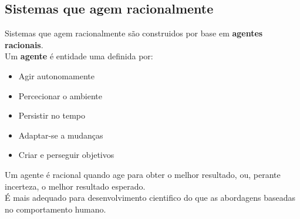 \documentclass[]{report}
\begin{document}
\subsection{Sistemas que agem racionalmente}
Sistemas que agem racionalmente são construidos por base em \textbf{agentes racionais}.\\
Um \textbf{agente} é entidade uma definida por:
\begin{multicols}{2}
\begin{itemize}
\item Agir autonomamente
\item Percecionar o ambiente
\item Persistir no tempo
\item Adaptar-se a mudanças
\item Criar e perseguir objetivos
\end{itemize}
\end{multicols}
Um agente é racional quando age para obter o melhor resultado, ou, perante incerteza, o melhor resultado esperado.\\
É mais adequado para desenvolvimento cientifico do que as abordagens baseadas no comportamento humano.
\end{document}
